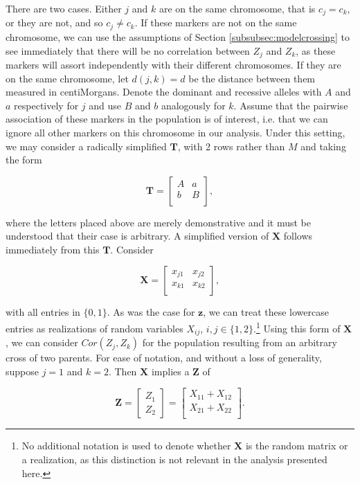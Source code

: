 \documentclass{article}
\newcommand{\ve}[1]{\mathbf{#1}}           %
\newcommand{\m}[1]{\mathbf{#1}}               %
\begin{document}
There are two cases. Either $j$ and $k$ are on the same chromosome, that is $c_j = c_k$, or they are not, and so $c_j \neq c_k$. If these markers are not on the same chromosome, we can use the assumptions of Section \ref{subsubsec:modelcrossing} to see immediately that there will be no correlation between $Z_j$ and $Z_k$, as these markers will assort independently with their different chromosomes. If they are on the same chromosome, let $d(j,k) = d$ be the distance between them measured in centiMorgans. Denote the dominant and recessive alleles with $A$ and $a$ respectively for $j$ and use $B$ and $b$ analogously for $k$. Assume that the pairwise association of these markers in the population is of interest, i.e. that we can ignore all other markers on this chromosome in our analysis. Under this setting, we may consider a radically simplified $\m{T}$, with 2 rows rather than $M$ and taking the form

$$\m{T} = \begin{bmatrix}
  A & a \\
  b & B \\
\end{bmatrix},$$

\noindent where the letters placed above are merely demonstrative and it must be understood that their case is arbitrary. A simplified version of $\m{X}$ follows immediately from this $\m{T}$. Consider

$$\m{X} = \begin{bmatrix}
  x_{j1} & x_{j2} \\
  x_{k1} & x_{k2} \\
\end{bmatrix},$$

\noindent with all entries in $\{0,1\}$. As was the case for $\ve{z}$, we can treat these lowercase entries as realizations of random variables $X_{ij}$, $i,j \in \{1,2\}$.\footnote{No additional notation is used to denote whether $\m{X}$ is the random matrix or a realization, as this distinction is not relevant in the analysis presented here.} Using this form of $\m{X}$, we can consider $Cor(Z_j, Z_k)$ for the population resulting from an arbitrary cross of two parents. For ease of notation, and without a loss of generality, suppose $j = 1$ and $k = 2$. Then $\m{X}$ implies a $\ve{Z}$ of

$$\ve{Z} = \begin{bmatrix} Z_1 \\ Z_2 \end{bmatrix} = \begin{bmatrix}
  X_{11} + X_{12} \\
  X_{21} + X_{22} \\
\end{bmatrix}.$$
\end{document}

